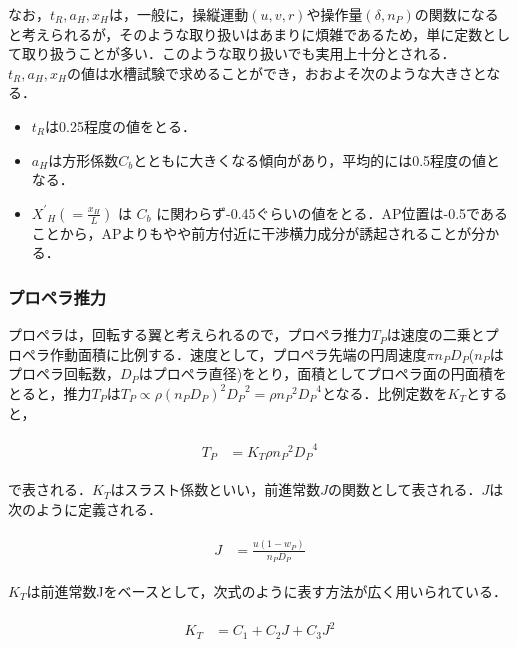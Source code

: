 なお，$t_R,a_H,x_H$は，一般に，操縦運動$(u,v,r)$や操作量$(\delta,n_P )$の関数になると考えられるが，そのような取り扱いはあまりに煩雑であるため，単に定数として取り扱うことが多い．このような取り扱いでも実用上十分とされる．$t_R,a_H,x_H$の値は水槽試験で求めることができ，おおよそ次のような大きさとなる．

\begin{itemize}
	\item $t_R$は0.25程度の値をとる．
	\item $a_H$は方形係数$C_b$とともに大きくなる傾向があり，平均的には0.5程度の値となる．
	\item ${X^{\prime}}_H (=\frac{x_H}{L})$ は $C_b$ に関わらず-0.45ぐらいの値をとる．AP位置は-0.5であることから，APよりもやや前方付近に干渉横力成分が誘起されることが分かる．
\end{itemize}

\subsubsection{プロペラ推力}
プロペラは，回転する翼と考えられるので，プロペラ推力$T_P$は速度の二乗とプロペラ作動面積に比例する．速度として，プロペラ先端の円周速度$\pi n_P  D_P$($n_P$はプロペラ回転数，$D_P$はプロペラ直径)をとり，面積としてプロペラ面の円面積をとると，推力$T_P$は$T_P \propto \rho (n_P D_P)^2 {D_P}^2 = \rho {n_P}^2 {D_P}^4$となる．比例定数を$K_T$とすると，

\begin{align}
    \begin{split}
        T_P &= K_T \rho {n_P}^2 {D_P}^4 \label{eq:2-28}
    \end{split}
\end{align}

で表される．$K_T$はスラスト係数といい，前進常数$J$の関数として表される．$J$は次のように定義される．

\begin{align}
    \begin{split}
        J &= \frac{u(1-w_P)}{n_P D_P} \label{eq:2-29}
    \end{split}
\end{align}

$K_T$は前進常数Jをベースとして，次式のように表す方法が広く用いられている．

\begin{align}
    \begin{split}
        K_T &= C_1 + C_2 J + C_3 J^2 \label{eq:2-30}
    \end{split}
\end{align}

